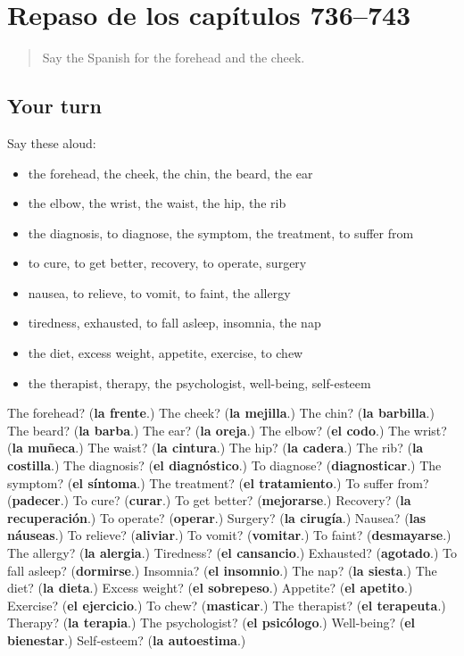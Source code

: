 \section[(dialogue)]{Repaso de los capítulos 736–743}

\label{lesson:ES-R743-repaso-736-743}



\begin{quote}
Say the Spanish for the forehead and the cheek.
\end{quote}

\subsection*{Your turn}
Say these aloud:

\begin{itemize}
\raggedright
  \item the forehead, the cheek, the chin, the beard, the ear
  \item the elbow, the wrist, the waist, the hip, the rib
  \item the diagnosis, to diagnose, the symptom, the treatment, to suffer from
  \item to cure, to get better, recovery, to operate, surgery
  \item nausea, to relieve, to vomit, to faint, the allergy
  \item tiredness, exhausted, to fall asleep, insomnia, the nap
  \item the diet, excess weight, appetite, exercise, to chew
  \item the therapist, therapy, the psychologist, well-being, self-esteem
\end{itemize}

\begin{tcolorbox}[breakable,colback=teal!4,colframe=teal!35!black,title={Before you move on}]
The forehead? (\textbf{la frente}.) The cheek? (\textbf{la mejilla}.) The chin? (\textbf{la barbilla}.) The beard? (\textbf{la barba}.) The ear? (\textbf{la oreja}.) The elbow? (\textbf{el codo}.) The wrist? (\textbf{la muñeca}.) The waist? (\textbf{la cintura}.) The hip? (\textbf{la cadera}.) The rib? (\textbf{la costilla}.) The diagnosis? (\textbf{el diagnóstico}.) To diagnose? (\textbf{diagnosticar}.) The symptom? (\textbf{el síntoma}.) The treatment? (\textbf{el tratamiento}.) To suffer from? (\textbf{padecer}.) To cure? (\textbf{curar}.) To get better? (\textbf{mejorarse}.) Recovery? (\textbf{la recuperación}.) To operate? (\textbf{operar}.) Surgery? (\textbf{la cirugía}.) Nausea? (\textbf{las náuseas}.) To relieve? (\textbf{aliviar}.) To vomit? (\textbf{vomitar}.) To faint? (\textbf{desmayarse}.) The allergy? (\textbf{la alergia}.) Tiredness? (\textbf{el cansancio}.) Exhausted? (\textbf{agotado}.) To fall asleep? (\textbf{dormirse}.) Insomnia? (\textbf{el insomnio}.) The nap? (\textbf{la siesta}.) The diet? (\textbf{la dieta}.) Excess weight? (\textbf{el sobrepeso}.) Appetite? (\textbf{el apetito}.) Exercise? (\textbf{el ejercicio}.) To chew? (\textbf{masticar}.) The therapist? (\textbf{el terapeuta}.) Therapy? (\textbf{la terapia}.) The psychologist? (\textbf{el psicólogo}.) Well-being? (\textbf{el bienestar}.) Self-esteem? (\textbf{la autoestima}.)
\end{tcolorbox}
